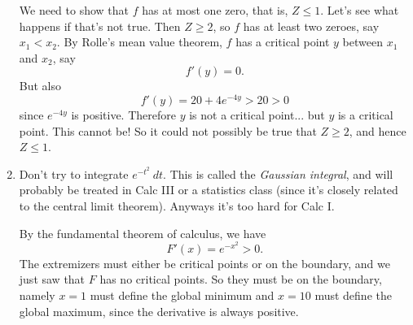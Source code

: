 \documentclass[reqno,12pt,letterpaper]{amsart}
\theoremstyle{definition}
\numberwithin{equation}{section}
\begin{document}
\begin{enumerate}
We need to show that $f$ has at most one zero, that is, $Z \leq 1$.
Let's see what happens if that's not true. Then $Z \geq 2$, so $f$ has at least two zeroes, say $x_1 < x_2$.
By Rolle's mean value theorem, $f$ has a critical point $y$ between $x_1$ and $x_2$, say
$$f'(y) = 0.$$
But also
$$f'(y) = 20 + 4e^{-4y} > 20 > 0$$
since $e^{-4y}$ is positive. Therefore $y$ is not a critical point... but $y$ is a critical point.
This cannot be! So it could not possibly be true that $Z \geq 2$, and hence $Z \leq 1$.
\item Don't try to integrate $e^{-t^2} ~dt$. This is called the \emph{Gaussian integral}, and will probably be treated in Calc III or a statistics class (since it's closely related to the central limit theorem). Anyways it's too hard for Calc I.

By the fundamental theorem of calculus, we have
$$F'(x) = e^{-x^2} > 0.$$
The extremizers must either be critical points or on the boundary, and we just saw that $F$ has no critical points.
So they must be on the boundary, namely $x = 1$ must define the global minimum and $x = 10$ must define the global maximum, since the derivative is always positive.

\end{enumerate}
\end{document}
